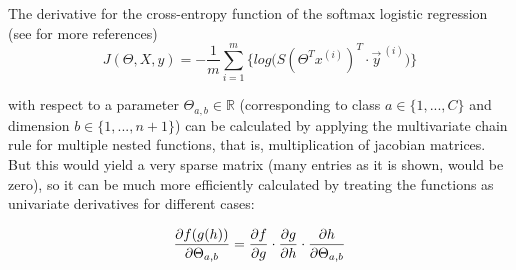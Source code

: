\begin{tcolorbox}

  The derivative for the cross-entropy function of the softmax logistic regression (see \cite{softmax} for more references)\\[-20]

  \begin{equation*}
    J(\Theta, X, y) = -\frac{1}{m}\sum_{i=1}^m \Big\{ log \big(S(\Theta^Tx^{(i)})^T \cdot \vec{y}^{\:(i)} \big) \Big\}
  \end{equation*}

  with respect to a parameter \(\Theta_{a,b} \in \mathbb{R}\) (corresponding to class \(a \in \{1, ..., C\}\) and dimension \(b \in \{1, ..., n+1\}\)) can be calculated by applying the multivariate chain rule for multiple nested functions, that is, multiplication of jacobian matrices. But this would yield a very sparse matrix (many entries as it is shown, would be zero), so it can be much more efficiently calculated by treating the functions as univariate derivatives for different cases:

  \begin{equation*}
    \frac{\partial f(g(h))}{\partial \Theta_{a,b}} = \frac{\partial f}{\partial g} \cdot \frac{\partial g}{\partial h} \cdot \frac{\partial h}{\partial \Theta_{a,b}}\\[1mm]
  \end{equation*}


\end{tcolorbox}
